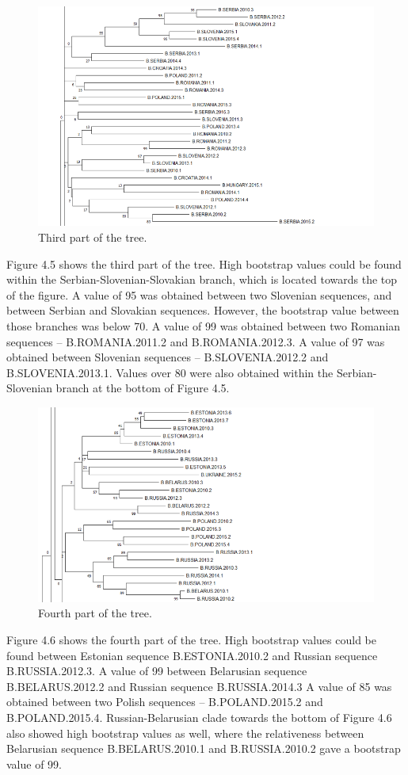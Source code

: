 \begin{figure}[h]
  \centering
  \includegraphics[width=0.7
\textwidth]{images/3.png}
  \caption{Third part of the tree.}
  \label{fig: Third part of the tree.}
\end{figure}

Figure 4.5 shows the third part of the tree. 
High bootstrap values could be found within the Serbian-Slovenian-Slovakian branch, which is located towards the top of the figure. 
A value of 95 was obtained between two Slovenian sequences, and between Serbian and Slovakian sequences. 
However, the bootstrap value between those branches was below 70.
A value of 99 was obtained between two Romanian sequences – B.ROMANIA.2011.2 and B.ROMANIA.2012.3.
A value of 97 was obtained between Slovenian sequences – B.SLOVENIA.2012.2 and B.SLOVENIA.2013.1.
Values over 80 were also obtained within the Serbian-Slovenian branch at the bottom of Figure 4.5.

\begin{figure}[h]
  \centering
  \includegraphics[width=0.7
\textwidth]{images/4.png}
  \caption{Fourth part of the tree.}
  \label{fig: Fourth part of the tree.}
\end{figure}

Figure 4.6 shows the fourth part of the tree. 
High bootstrap values could be found between Estonian sequence B.ESTONIA.2010.2 and Russian sequence B.RUSSIA.2012.3.
A value of 99 between Belarusian sequence B.BELARUS.2012.2 and Russian sequence B.RUSSIA.2014.3
A value of 85 was obtained between two Polish sequences – B.POLAND.2015.2 and B.POLAND.2015.4. 
Russian-Belarusian clade towards the bottom of Figure 4.6 also showed high bootstrap values as well, where the relativeness between Belarusian sequence B.BELARUS.2010.1 and B.RUSSIA.2010.2 gave a bootstrap value of 99. 

